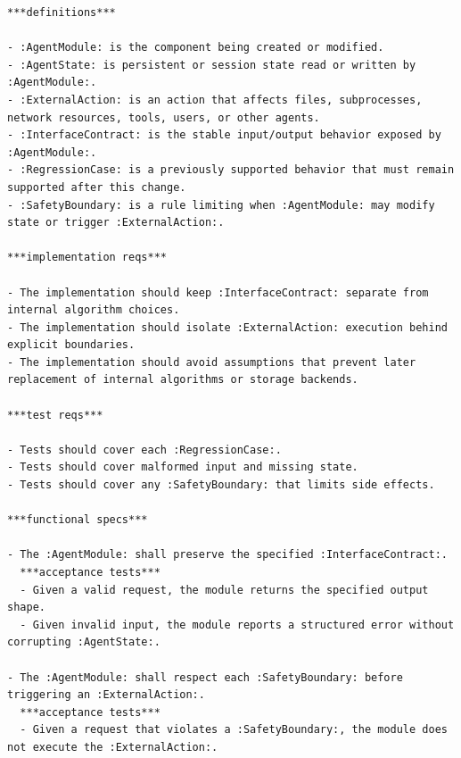 \documentclass[11pt]{article}
\begin{document}
\begin{lstlisting}
***definitions***

- :AgentModule: is the component being created or modified.
- :AgentState: is persistent or session state read or written by :AgentModule:.
- :ExternalAction: is an action that affects files, subprocesses, network resources, tools, users, or other agents.
- :InterfaceContract: is the stable input/output behavior exposed by :AgentModule:.
- :RegressionCase: is a previously supported behavior that must remain supported after this change.
- :SafetyBoundary: is a rule limiting when :AgentModule: may modify state or trigger :ExternalAction:.

***implementation reqs***

- The implementation should keep :InterfaceContract: separate from internal algorithm choices.
- The implementation should isolate :ExternalAction: execution behind explicit boundaries.
- The implementation should avoid assumptions that prevent later replacement of internal algorithms or storage backends.

***test reqs***

- Tests should cover each :RegressionCase:.
- Tests should cover malformed input and missing state.
- Tests should cover any :SafetyBoundary: that limits side effects.

***functional specs***

- The :AgentModule: shall preserve the specified :InterfaceContract:.
  ***acceptance tests***
  - Given a valid request, the module returns the specified output shape.
  - Given invalid input, the module reports a structured error without corrupting :AgentState:.

- The :AgentModule: shall respect each :SafetyBoundary: before triggering an :ExternalAction:.
  ***acceptance tests***
  - Given a request that violates a :SafetyBoundary:, the module does not execute the :ExternalAction:.
\end{lstlisting}
\end{document}
